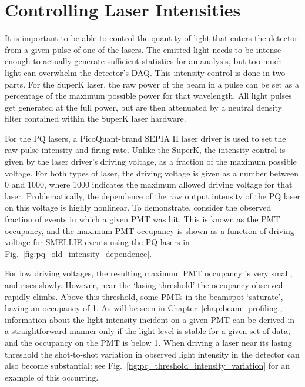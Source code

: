\section{Controlling Laser Intensities}\label{sec:smellie_attenuators}
It is important to be able to control the quantity of light that enters the detector from a given pulse of one of the lasers. The emitted light needs to be intense enough to actually generate sufficient statistics for an analysis, but too much light can overwhelm the detector's DAQ. This intensity control is done in two parts. For the SuperK laser, the raw power of the beam in a pulse can be set as a percentage of the maximum possible power for that wavelength. All light pulses get generated at the full power, but are then attenuated by a neutral density filter contained within the SuperK laser hardware.

For the PQ lasers, a PicoQuant-brand SEPIA II laser driver is used to set the raw pulse intensity and firing rate. Unlike the SuperK, the intensity control is given by the laser driver's driving voltage, as a fraction of the maximum possible voltage. For both types of laser, the driving voltage is given as a number between 0 and 1000, where 1000 indicates the maximum allowed driving voltage for that laser. Problematically, the dependence of the raw output intensity of the PQ laser on this voltage is highly nonlinear. To demonstrate, consider the observed fraction of events in which a given PMT was hit. This is known as the PMT occupancy, and the maximum PMT occupancy is shown as a function of driving voltage for SMELLIE events using the PQ lasers in Fig.~\ref{fig:pq_old_intensity_dependence}.

For low driving voltages, the resulting maximum PMT occupancy is very small, and rises slowly. However, near the `lasing threshold' the occupancy observed rapidly climbs. Above this threshold, some PMTs in the beamspot `saturate', having an occupancy of 1. As will be seen in Chapter~\ref{chap:beam_profiling}, information about the light intensity incident on a given PMT can be derived in a straightforward manner only if the light level is stable for a given set of data, and the occupancy on the PMT is below 1. When driving a laser near its lasing threshold the shot-to-shot variation in observed light intensity in the detector can also become substantial: see Fig.~\ref{fig:pq_threshold_intensity_variation} for an example of this occurring.

